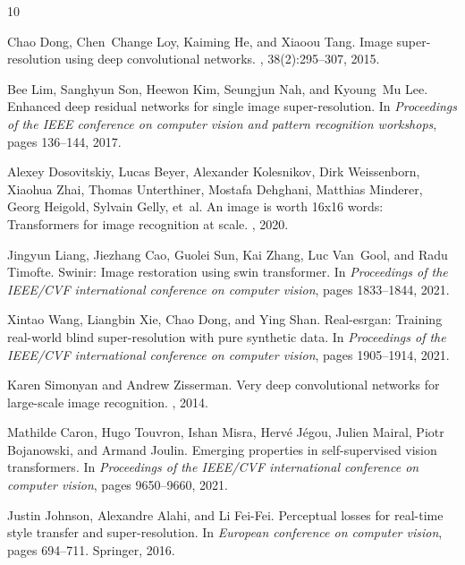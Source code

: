 \documentclass[10pt,twocolumn,letterpaper]{article}
\begin{document}
\begin{thebibliography}{10}\itemsep=-1pt

Chao Dong, Chen~Change Loy, Kaiming He, and Xiaoou Tang.
\newblock Image super-resolution using deep convolutional networks.
, 38(2):295--307, 2015.

Bee Lim, Sanghyun Son, Heewon Kim, Seungjun Nah, and Kyoung~Mu Lee.
\newblock Enhanced deep residual networks for single image super-resolution.
\newblock In {\em Proceedings of the IEEE conference on computer vision and pattern recognition workshops}, pages 136--144, 2017.

Alexey Dosovitskiy, Lucas Beyer, Alexander Kolesnikov, Dirk Weissenborn, Xiaohua Zhai, Thomas Unterthiner, Mostafa Dehghani, Matthias Minderer, Georg Heigold, Sylvain Gelly, et~al.
\newblock An image is worth 16x16 words: Transformers for image recognition at scale.
, 2020.

Jingyun Liang, Jiezhang Cao, Guolei Sun, Kai Zhang, Luc Van~Gool, and Radu Timofte.
\newblock Swinir: Image restoration using swin transformer.
\newblock In {\em Proceedings of the IEEE/CVF international conference on computer vision}, pages 1833--1844, 2021.

Xintao Wang, Liangbin Xie, Chao Dong, and Ying Shan.
\newblock Real-esrgan: Training real-world blind super-resolution with pure synthetic data.
\newblock In {\em Proceedings of the IEEE/CVF international conference on computer vision}, pages 1905--1914, 2021.

Karen Simonyan and Andrew Zisserman.
\newblock Very deep convolutional networks for large-scale image recognition.
, 2014.

Mathilde Caron, Hugo Touvron, Ishan Misra, Herv{\'e} J{\'e}gou, Julien Mairal, Piotr Bojanowski, and Armand Joulin.
\newblock Emerging properties in self-supervised vision transformers.
\newblock In {\em Proceedings of the IEEE/CVF international conference on computer vision}, pages 9650--9660, 2021.

Justin Johnson, Alexandre Alahi, and Li Fei-Fei.
\newblock Perceptual losses for real-time style transfer and super-resolution.
\newblock In {\em European conference on computer vision}, pages 694--711. Springer, 2016.


\end{thebibliography}
\end{document}
